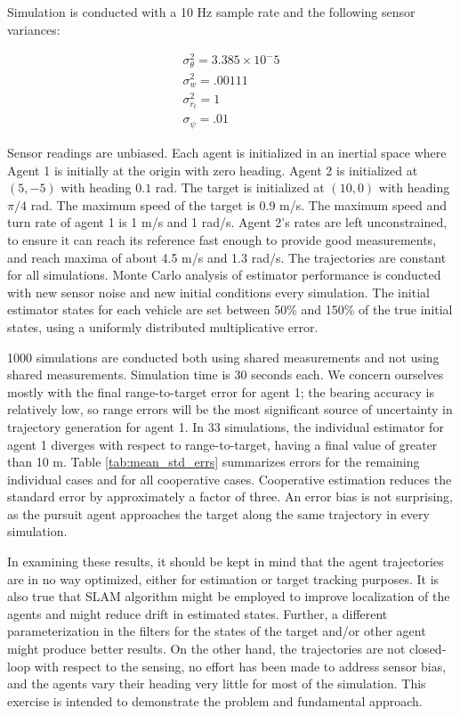 \documentclass{aiaa-tc}
\begin{document}
Simulation is conducted with a 10 Hz sample rate and the following sensor variances:

\begin{align}
\sigma_\theta^2 = 3.385 \times 10^-5 \\
\sigma_w^2 = .00111 \\
\sigma_{r_t}^2 = 1 \\
\sigma_{\dot{\psi}} = .01
\end{align}

Sensor readings are unbiased. Each agent is initialized in an inertial space where Agent 1 is initially at the origin with zero heading. Agent 2 is initialized at $(5,-5)$ with heading $0.1$ rad. The target is initialized at $(10,0)$ with heading $\pi/4$ rad. The maximum speed of the target is 0.9 m/s. The maximum speed and turn rate of agent 1 is 1 m/s and 1 rad/s. Agent 2's rates are left unconstrained, to ensure it can reach its reference fast enough to provide good measurements, and reach maxima of about 4.5 m/s and 1.3 rad/s. The trajectories are constant for all simulations. Monte Carlo analysis of estimator performance is conducted with new sensor noise and new initial conditions every simulation. The initial estimator states for each vehicle are set between 50\% and 150\% of the true initial states, using a uniformly distributed multiplicative error.

1000 simulations are conducted both using shared measurements and not using shared measurements. Simulation time is 30 seconds each. We concern ourselves mostly with the final range-to-target error for agent 1; the bearing accuracy is relatively low, so range errors will be the most significant source of uncertainty in trajectory generation for agent 1. In 33 simulations, the individual estimator for agent 1 diverges with respect to range-to-target, having a final value of greater than 10 m. Table \ref{tab:mean_std_errs} summarizes errors for the remaining individual cases and for all cooperative cases. Cooperative estimation reduces the standard error by approximately a factor of three. An error bias is not surprising, as the pursuit agent approaches the target along the same trajectory in every simulation.

In examining these results, it should be kept in mind that the agent trajectories are in no way optimized, either for estimation or target tracking purposes. It is also true that SLAM algorithm might be employed to improve localization of the agents and might reduce drift in estimated states. Further, a different parameterization in the filters for the states of the target and/or other agent might produce better results. On the other hand, the trajectories are not closed-loop with respect to the sensing, no effort has been made to address sensor bias, and the agents vary their heading very little for most of the simulation. This exercise is intended to demonstrate the problem and fundamental approach.
\end{document}
